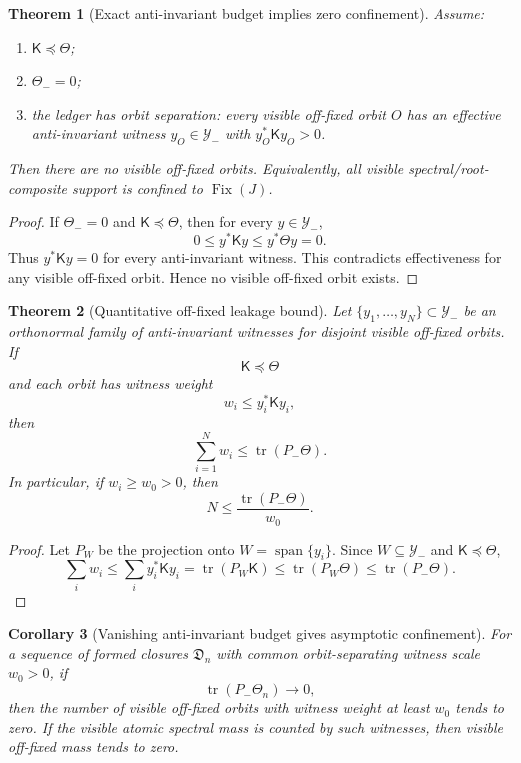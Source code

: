\documentclass[11pt]{article}
\newtheorem{theorem}{Theorem}[section]
\newtheorem{corollary}[theorem]{Corollary}
\newcommand{\Kmat}{\mathsf K}
\newcommand{\ThetaB}{\mathsf\Theta}
\newcommand{\Fix}{\operatorname{Fix}}
\newcommand{\trc}{\operatorname{tr}}
\begin{document}
\begin{theorem}[Exact anti-invariant budget implies zero confinement]
Assume:
\begin{enumerate}[label=(\roman*)]
\item $\Kmat\preceq\ThetaB$;
\item $\Theta_-=0$;
\item the ledger has orbit separation: every visible off-fixed orbit $O$ has an effective anti-invariant witness $y_O\in\mathcal Y_-$ with $y_O^*\Kmat y_O>0$.
\end{enumerate}
Then there are no visible off-fixed orbits.  Equivalently, all visible spectral/root-composite support is confined to $\Fix(J)$.
\end{theorem}

\begin{proof}
If $\Theta_-=0$ and $\Kmat\preceq\ThetaB$, then for every $y\in\mathcal Y_-$,
\[
0\le y^*\Kmat y\le y^*\ThetaB y=0.
\]
Thus $y^*\Kmat y=0$ for every anti-invariant witness.  This contradicts effectiveness for any visible off-fixed orbit.  Hence no visible off-fixed orbit exists.
\end{proof}

\begin{theorem}[Quantitative off-fixed leakage bound]
Let $\{y_1,\dots,y_N\}\subset\mathcal Y_-$ be an orthonormal family of anti-invariant witnesses for disjoint visible off-fixed orbits.  If
\[
\Kmat\preceq\ThetaB
\]
and each orbit has witness weight
\[
w_i\le y_i^*\Kmat y_i,
\]
then
\[
\sum_{i=1}^N w_i
\le
\trc(P_-\ThetaB).
\]
In particular, if $w_i\ge w_0>0$, then
\[
N\le \frac{\trc(P_-\ThetaB)}{w_0}.
\]
\end{theorem}

\begin{proof}
Let $P_W$ be the projection onto $W=\operatorname{span}\{y_i\}$.  Since $W\subseteq\mathcal Y_-$ and $\Kmat\preceq\ThetaB$,
\[
\sum_i w_i
\le
\sum_i y_i^*\Kmat y_i
=
\trc(P_W\Kmat)
\le
\trc(P_W\ThetaB)
\le
\trc(P_-\ThetaB).
\]
\end{proof}

\begin{corollary}[Vanishing anti-invariant budget gives asymptotic confinement]
For a sequence of formed closures $\mathfrak D_n$ with common orbit-separating witness scale $w_0>0$, if
\[
\trc(P_-\ThetaB_n)\to0,
\]
then the number of visible off-fixed orbits with witness weight at least $w_0$ tends to zero.  If the visible atomic spectral mass is counted by such witnesses, then visible off-fixed mass tends to zero.
\end{corollary}
\end{document}
